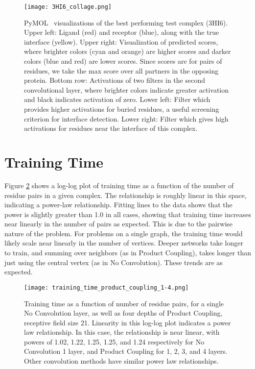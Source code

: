 \begin{figure}
	\texttt{[image: 3HI6\_collage.png]}
	\caption{PyMOL~\cite{schrodinger2015} visualizations of the best performing test complex (3HI6). Upper left: Ligand (red) and receptor (blue), along with the true interface (yellow). Upper right: Visualization of predicted scores, where brighter colors (cyan and orange) are higher scores and darker colors (blue and red) are lower scores. Since scores are for pairs of residues, we take the max score over all partners in the opposing protein. Bottom row: Activations of two filters in the second convolutional layer, where brighter colors indicate greater activation and black indicates activation of zero. Lower left: Filter which provides higher activations for buried residues, a useful screening criterion for interface detection. Lower right: Filter which gives high activations for residues near the interface of this complex.
		\label{fig:filter_vis}}
\end{figure}


\section{Training Time}

Figure \ref{fig:train_times} shows a log-log plot of training time as a function of the number of residue pairs in a given complex.
The relationship is roughly linear in this space, indicating a power-law relationship.
Fitting lines to the data shows that the power is slightly greater than 1.0 in all cases, showing that training time increases near linearly in the number of pairs as expected.
This is due to the pairwise nature of the problem.
For problems on a single graph, the training time would likely scale near linearly in the number of vertices.
Deeper networks take longer to train, and summing over neighbors (as in Product Coupling), takes longer than just using the central vertex (as in No Convolution).
These trends are as expected. 


\begin{figure}
	\texttt{[image: training\_time\_product\_coupling\_1-4.png]}
	\caption{Training time as a function of number of residue pairs, for a single No Convolution layer, as well as four depths of Product Coupling, receptive field size 21. Linearity in this log-log plot indicates a power law relationship. In this case, the relationship is near linear, with powers of 1.02, 1.22, 1.25, 1.25, and 1.24 respectively for No Convolution 1 layer, and Product Coupling for 1, 2, 3, and 4 layers. Other convolution methods have similar power law relationships. 
		\label{fig:train_times}}
\end{figure}
